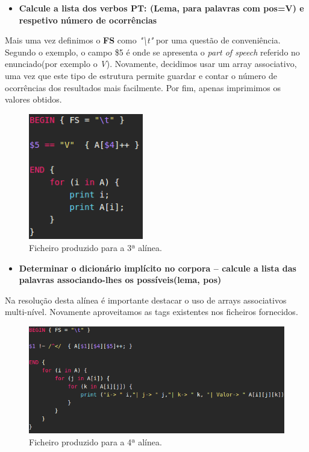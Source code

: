 \documentclass[a4paper]{article}
\begin{document}
\begin{itemize}
	\item \textbf{Calcule a lista dos verbos PT: (Lema, para palavras com pos=V) e respetivo número de ocorrências}
\end{itemize}
Mais uma vez definimos o \textbf{FS} como \textit{"\textbackslash t"} por uma questão de conveniência. Segundo o exemplo, o campo \$5 é onde se apresenta o \textit{part of speech} referido no enunciado(por exemplo o \textit{V}). Novamente, decidimos usar um array associativo, uma vez que este tipo de estrutura permite guardar e contar o número de ocorrências dos resultados mais facilmente. Por fim, apenas imprimimos os valores obtidos.

\begin{figure}[h!]
  \includegraphics[width=50mm]{alinea3.png} \centering
  \caption{Ficheiro produzido para a 3ª alínea.}
  \label{fig:alinea3}
\end{figure}

\newpage

\begin{itemize}
	\item \textbf{Determinar  o  dicionário  implícito  no  corpora  –  calcule  a  lista  das  palavras  associando-lhes  os  possíveis(lema, pos)} 
\end{itemize}
Na resolução desta alínea é importante destacar o uso de arrays associativos multi-nível. Novamente aproveitamos as tags existentes nos ficheiros fornecidos.


\begin{figure}[h!]
  \includegraphics[width=150mm]{alinea4.png} \centering
  \caption{Ficheiro produzido para a 4ª alínea.}
  \label{fig:alinea4}
\end{figure}
\end{document}

